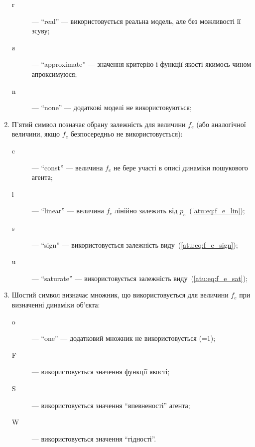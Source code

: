 \begin{enumerate}
\begin{description}
      \item[r] --- ``real'' ---
        використовується реальна модель, але без можливості її зсуву;

      \item[а] --- ``approximate'' ---
        значення критерію і функції якості якимось чином
        апроксимуюся;

      \item[n] --- ``none'' ---
        додаткові моделі не використовуються;

    \end{description}

  \item
    П'ятий символ
    позначає обрану залежність для величини $f_e$ (або
    аналогічної величини, якщо $f_e$ безпосередньо не використовується):
    \begin{description}

      \item[c]  --- ``const'' ---
        величина $f_e$ не бере участі в описі динаміки пошукового агента;

      \item[l] --- ``linear'' ---
        величина $f_e$ лінійно залежить від $p_e$~(\ref{atu:eq:f_e_lin});

      \item[s] --- ``sign'' ---
        використовується залежність виду~(\ref{atu:eq:f_e_sign});

      \item[u] --- ``saturate'' ---
        використовується залежність виду~(\ref{atu:eq:f_e_sat});

    \end{description}

  \item
    Шостий символ  визначає множник,
    що використовується для величини $f_e$ при визначенні динаміки об'єкта:
    \begin{description}

      \item[o]  --- ``one'' ---
        додатковий множник не використовується (=1);

      \item[F] ---
        використовується значення функції якості;

      \item[S] ---
        використовується значення ``впевненості'' агента;

      \item[W] ---
        використовується значення ``гідності''.


\end{description}
\end{enumerate}
